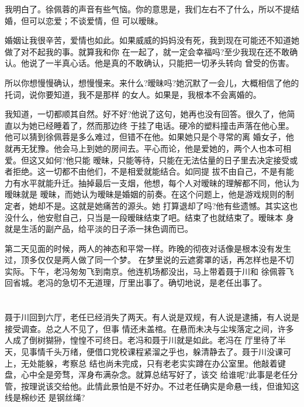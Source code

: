 \documentclass[11pt,a4paper,onecolumn]{article}
\begin{document}
我明白了。徐佩蓉的声音有些气恼。你的意思是，我们左右不了什么，所以不提结婚，但可以恋爱；不谈爱情，但
可以暧昧。

婚姻让我很辛苦，爱情也如此。如果威威的妈妈没有死，我到现在可能还不知道她做了对不起我的事。就算我和你
在一起了，就一定会幸福吗?至少我现在还不敢确认。他说了一半真心话。他是真的不敢确认，只能把一切矛头转向
曾受的伤害。

所以你想慢慢确认，想慢慢来。来什么?暧昧吗?她沉默了一会儿，大概相信了他的托词，说你要知道，我不是那样
的女人。如果是，我根本不会离婚的。

我知道，一切都顺其自然。好不好?他说了这句，她再也没有回答。很久了，他简直以为她已经睡着了，然而那边终
于挂了电话。硬冷的塑料撞击声落在他心里。他可以猜到徐佩蓉是多么难过，但错不在他。如果她只是个寻常的离
婚女子，他就再无犹豫。他会马上到她的房间去。平心而论，他是爱她的，两个人也本可相爱。但这又如何?他只能
暧昧，只能等待，只能在无法估量的日子里去决定接受或者拒绝。这一切都不由他们，不是相爱就能结合。如同提
拔不由自己，不是有能力有水平就能升迁。抽掉最后一支烟，他想，每个人对暧昧的理解都不同，他认为暧昧就是
暧昧，而她认为暧昧是婚姻的前奏。在这个问题上，他是游戏规则的制定者，她却不是。这就是她痛苦的源头。她
打算退却了吗?他有些遗憾。其实这也没什么，他安慰自己，只当是一段暧昧结束了吧。结束了也就结束了。暧昧本
身就是生活的副产品，给平淡的日子添一抹色调而已。

第二天见面的时候，两人的神态和平常一样。昨晚的彻夜对话像是根本没有发生过，顶多仅仅是两人做了同一个梦。
在梦里说的云遮雾罩的话，再怎样也是不切实际。下午，老冯匆匆飞到南京。他连机场都没出，马上带着聂于川和
徐佩蓉飞回省城。老冯的急切不无道理，厅里出事了。确切地说，是老任出事了。

\section[\thesection]{}

聂于川回到六厅，老任已经消失了两天。有人说是双规，有人说是逮捕，有人说是接受调查。总之人不见了，但事
情还未盖棺。在悬而未决与尘埃落定之间，许多人成了倒树猢狲，惶惶不可终日。老冯和聂于川就是如此。老冯在
厅里待了半天，见事情千头万绪，便借口党校课程紧溜之乎也，躲清静去了。聂于川没课可上，无处能躲，考察总
结也尚未完成，只有老老实实蹲在办公室里。他敲着键盘，心中全是旁骛，浑身布满杂念。就算总结写好了，该交
给谁呢?此事是老任分管，按理说该交给他。此情此景怕是不好办。不过老任确实是命悬一线，但谁知这线是棉纱还
是钢丝绳?
\end{document}
